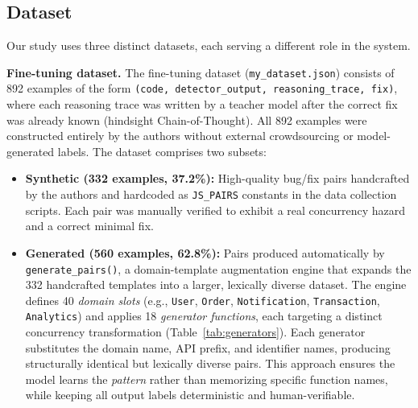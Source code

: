 \documentclass[runningheads]{llncs}
\begin{document}
\subsection{Dataset}
\label{sec:design:dataset}

Our study uses three distinct datasets, each serving a different role in
the system.

\textbf{Fine-tuning dataset.}
The fine-tuning dataset (\texttt{my\_dataset.json}) consists of 892 examples of the form
\texttt{(code, detector\_output, reasoning\_trace, fix)}, where each
reasoning trace was written by a teacher model after the correct fix was
already known (hindsight Chain-of-Thought).
All 892 examples were constructed entirely by the authors without
external crowdsourcing or model-generated labels.
The dataset comprises two subsets:

\begin{itemize}[leftmargin=2em, nosep]
  \item \textbf{Synthetic (332 examples, 37.2\%):} High-quality
    bug/fix pairs handcrafted by the authors and hardcoded as
    \texttt{JS\_PAIRS} constants in the data collection scripts.
    Each pair was manually verified to exhibit a real concurrency hazard
    and a correct minimal fix.
  \item \textbf{Generated (560 examples, 62.8\%):} Pairs produced
    automatically by \texttt{generate\_pairs()}, a domain-template
    augmentation engine that expands the 332 handcrafted templates
    into a larger, lexically diverse dataset.
    The engine defines 40 \emph{domain slots}
    (e.g., \texttt{User}, \texttt{Order}, \texttt{Notification},
    \texttt{Transaction}, \texttt{Analytics})
    and applies 18 \emph{generator functions}, each targeting a
    distinct concurrency transformation (Table~\ref{tab:generators}).
    Each generator substitutes the domain name, API prefix, and
    identifier names, producing structurally identical but lexically
    diverse pairs.
    This approach ensures the model learns the \emph{pattern}
    rather than memorizing specific function names, while keeping
    all output labels deterministic and human-verifiable.
\end{itemize}

\vspace{-0.5cm}
\end{document}

